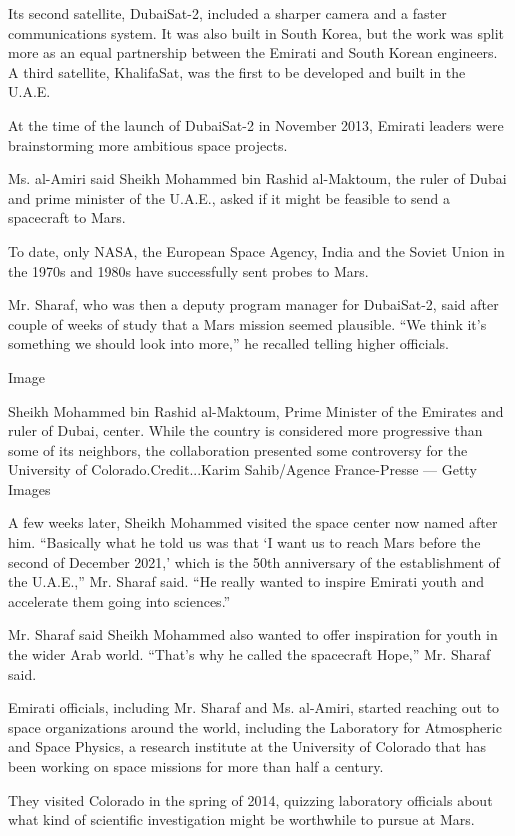 Its second satellite, DubaiSat-2, included a sharper camera and a faster
communications system. It was also built in South Korea, but the work
was split more as an equal partnership between the Emirati and South
Korean engineers. A third satellite, KhalifaSat, was the first to be
developed and built in the U.A.E.

At the time of the launch of DubaiSat-2 in November 2013, Emirati
leaders were brainstorming more ambitious space projects.

Ms. al-Amiri said Sheikh Mohammed bin Rashid al-Maktoum, the ruler of
Dubai and prime minister of the U.A.E., asked if it might be feasible to
send a spacecraft to Mars.

To date, only NASA, the European Space Agency, India and the Soviet
Union in the 1970s and 1980s have successfully sent probes to Mars.

Mr. Sharaf, who was then a deputy program manager for DubaiSat-2, said
after couple of weeks of study that a Mars mission seemed plausible.
``We think it's something we should look into more,'' he recalled
telling higher officials.

Image

Sheikh Mohammed bin Rashid al-Maktoum, Prime Minister of the Emirates
and ruler of Dubai, center. While the country is considered more
progressive than some of its neighbors, the collaboration presented some
controversy for the University of Colorado.Credit...Karim Sahib/Agence
France-Presse --- Getty Images

A few weeks later, Sheikh Mohammed visited the space center now named
after him. ``Basically what he told us was that `I want us to reach Mars
before the second of December 2021,' which is the 50th anniversary of
the establishment of the U.A.E.,'' Mr. Sharaf said. ``He really wanted
to inspire Emirati youth and accelerate them going into sciences.''

Mr. Sharaf said Sheikh Mohammed also wanted to offer inspiration for
youth in the wider Arab world. ``That's why he called the spacecraft
Hope,'' Mr. Sharaf said.

Emirati officials, including Mr. Sharaf and Ms. al-Amiri, started
reaching out to space organizations around the world, including the
Laboratory for Atmospheric and Space Physics, a research institute at
the University of Colorado that has been working on space missions for
more than half a century.

They visited Colorado in the spring of 2014, quizzing laboratory
officials about what kind of scientific investigation might be
worthwhile to pursue at Mars.

